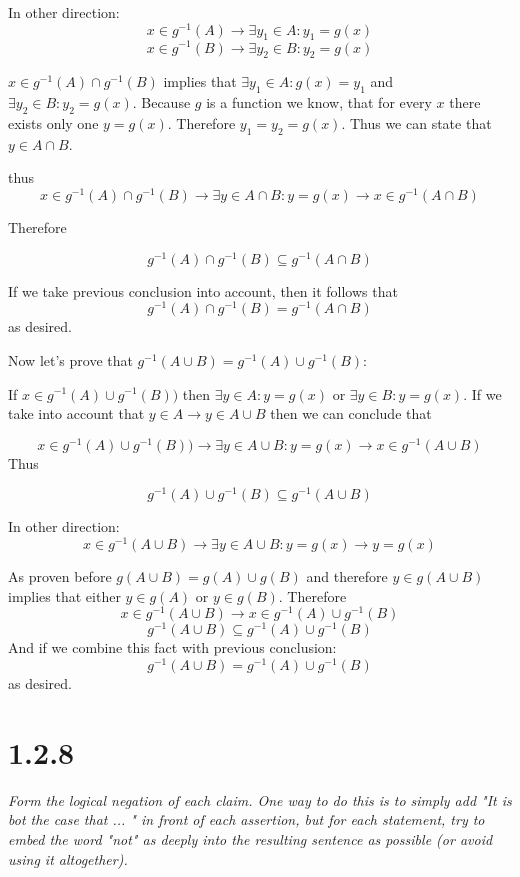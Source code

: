 \documentclass[11pt,oneside,titlepage]{book}
\begin{document}
In other direction: 
$$x \in g^{-1}(A) \to \exists y_1 \in A: y_1 = g(x)$$
$$x \in g^{-1}(B) \to \exists y_2 \in B: y_2 = g(x)$$

$x \in g^{-1}(A) \cap g^{-1}(B)$ implies that $ \exists y_1 \in
A: g(x) = y_1$ and $\exists y_2 \in B: y_2 = g(x)$.
Because $g$ is a function we know, that
for every $x$ there exists only one $y = g(x)$. Therefore $y_1 = y_2 = g(x)$.
Thus we can state that $y \in A \cap B$.

thus
$$x \in g^{-1}(A) \cap g^{-1}(B) \to \exists y \in A \cap B: y = g(x) \to
x \in g^{-1}(A \cap B)$$

Therefore 

$$ g^{-1}(A) \cap g^{-1}(B) \subseteq   g^{-1}(A \cap B)$$

If we take previous conclusion into account, then it follows that
$$ g^{-1}(A) \cap g^{-1}(B) = g^{-1}(A \cap B)$$
as desired.

Now let's prove that  $g^{-1}(A \cup B) = g^{-1}(A) \cup g^{-1}(B)$:


If $ x \in g^{-1}(A) \cup g^{-1}(B))$ then  $\exists y \in A: y = g(x)$ or
$\exists y \in B: y = g(x)$. If we take into account that
$y \in A \to y \in A \cup B$ then we can conclude that

$$ x \in g^{-1}(A) \cup g^{-1}(B)) \to \exists y \in A \cup B : y = g(x) \to
x \in g^{-1}(A \cup B)$$
Thus

$$g^{-1}(A) \cup g^{-1}(B) \subseteq g^{-1}(A \cup B)$$

In other direction: 
$$x \in g^{-1}(A \cup B) \to \exists y \in A \cup B: y = g(x) \to y = g(x)$$

As proven before $g(A \cup B) = g(A) \cup g(B)$ and therefore
$y \in g(A \cup B)$ implies that either $y \in g(A)$ or $y \in g(B)$. Therefore
$$ x \in g^{-1}(A \cup B) \to x \in g^{-1}(A) \cup g^{-1}(B)$$
$$ g^{-1}(A \cup B)  \subseteq g^{-1}(A) \cup g^{-1}(B)$$
And if we combine this fact with previous conclusion:
$$ g^{-1}(A \cup B) =  g^{-1}(A) \cup g^{-1}(B)$$
as desired.

\section*{1.2.8}

\textit{Form the logical negation of each claim. One way to do this is to
  simply add "It is bot the case that ... " in front of each assertion, but for
  each statement, try to embed the word "not" as deeply into the resulting
  sentence as possible (or avoid using it altogether).}
\end{document}
